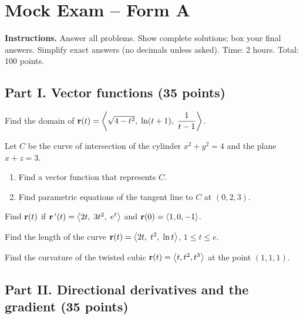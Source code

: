 \section{Mock Exam -- Form A}\label{ch:exam-a}

\textbf{Instructions.} Answer all problems. Show complete solutions; box your
final answers. Simplify exact answers (no decimals unless asked).
Time: 2 hours. Total: 100 points.

\subsection*{Part I. Vector functions (35 points)}

\begin{questions}
\item Find the domain of
      $\mathbf{r}(t)=\left\langle \sqrt{4-t^2},\;\ln(t+1),\;\dfrac{1}{t-1} \right\rangle$. 
\item Let $C$ be the curve of intersection of the cylinder $x^2+y^2=4$ and the
      plane $x+z=3$.
      \begin{enumerate}[label=(\alph*)]
        \item Find a vector function that represents $C$.
        \item Find parametric equations of the tangent line to $C$ at $(0,2,3)$.
      \end{enumerate}
\item Find $\mathbf{r}(t)$ if $\mathbf{r}\,'(t)=\left\langle 2t,\;3t^2,\;e^t \right\rangle$ and $\mathbf{r}(0)=\left\langle 1,0,-1 \right\rangle$. 
\item Find the length of the curve $\mathbf{r}(t)=\left\langle 2t,\;t^2,\;\ln t \right\rangle$, $1\le t\le e$. 
\item Find the curvature of the twisted cubic $\mathbf{r}(t)=\left\langle t,t^2,t^3 \right\rangle$ at the point $(1,1,1)$. 
\end{questions}

\subsection*{Part II. Directional derivatives and the gradient (35 points)}

